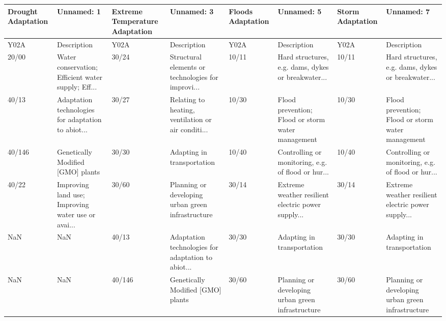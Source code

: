 \begin{tabular}{llllllll}
\toprule
Drought Adaptation &                                         Unnamed: 1 & Extreme Temperature Adaptation &                                         Unnamed: 3 & Floods Adaptation &                                         Unnamed: 5 & Storm Adaptation &                                         Unnamed: 7 \\
\midrule
              Y02A &                                        Description &                           Y02A &                                        Description &              Y02A &                                        Description &             Y02A &                                        Description \\
             20/00 & Water conservation; Efficient water supply; Eff... &                          30/24 & Structural elements or technologies for improvi... &             10/11 & Hard structures, e.g. dams, dykes or breakwater... &            10/11 & Hard structures, e.g. dams, dykes or breakwater... \\
             40/13 & Adaptation technologies for adaptation to abiot... &                          30/27 & Relating to heating, ventilation or air conditi... &             10/30 &  Flood prevention; Flood or storm water management &            10/30 &  Flood prevention; Flood or storm water management \\
            40/146 &                  Genetically Modified [GMO] plants &                          30/30 &                         Adapting in transportation &             10/40 & Controlling or monitoring, e.g. of flood or hur... &            10/40 & Controlling or monitoring, e.g. of flood or hur... \\
             40/22 & Improving land use; Improving water use or avai... &                          30/60 &  Planning or developing urban green infrastructure &             30/14 & Extreme weather resilient electric power supply... &            30/14 & Extreme weather resilient electric power supply... \\
               NaN &                                                NaN &                          40/13 & Adaptation technologies for adaptation to abiot... &             30/30 &                         Adapting in transportation &            30/30 &                         Adapting in transportation \\
               NaN &                                                NaN &                         40/146 &                  Genetically Modified [GMO] plants &             30/60 &  Planning or developing urban green infrastructure &            30/60 &  Planning or developing urban green infrastructure \\

\end{tabular}
